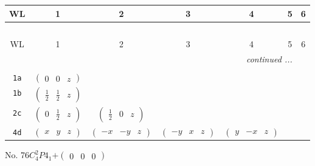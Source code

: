 \documentclass[fleqn,9pt,landscape]{jsarticle}
\begin{document}
\begin{center}
\renewcommand{\arraystretch}{1.2}
\begin{longtable}{ccccccc}
 \hline \hline
WL & 1 & 2 & 3 & 4 & 5 & 6 \\ \hline \endfirsthead

\multicolumn{6}{l}{\tablename\ \thetable{}} \\
 \hline \hline
WL & 1 & 2 & 3 & 4 & 5 & 6 \\ \hline \endhead

 \hline \hline
\multicolumn{6}{r}{\footnotesize\it continued ...} \\ \endfoot

 \hline \hline
\multicolumn{6}{r}{} \\ \endlastfoot

{\tt 1a} & $ \begin{pmatrix} 0 & 0 & z \end{pmatrix} $ & $  $ & $  $ & $  $ \\ \hline
{\tt 1b} & $ \begin{pmatrix} \frac{1}{2} & \frac{1}{2} & z \end{pmatrix} $ & $  $ & $  $ & $  $ \\ \hline
{\tt 2c} & $ \begin{pmatrix} 0 & \frac{1}{2} & z \end{pmatrix} $ & $ \begin{pmatrix} \frac{1}{2} & 0 & z \end{pmatrix} $ & $  $ & $  $ \\ \hline
{\tt 4d} & $ \begin{pmatrix} x & y & z \end{pmatrix} $ & $ \begin{pmatrix} - x & - y & z \end{pmatrix} $ & $ \begin{pmatrix} - y & x & z \end{pmatrix} $ & $ \begin{pmatrix} y & - x & z \end{pmatrix} $ \\
\end{longtable}
\end{center}
\newpage
No. 76\quad$C_{4}^{2}$\quad$P4_1$\quad[ tetragonal ]\quad$+\begin{pmatrix} 0 & 0 & 0 \end{pmatrix}$
\end{document}
